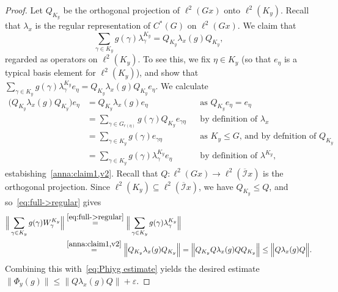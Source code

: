 \documentclass[a4paper, 12pt]{amsart}
\theoremstyle{plain}
\theoremstyle{definition}
\theoremstyle{remark}
\newcommand{\Iicl}{\overline{\mathcal{I}}}
\numberwithin{equation}{section}
\begin{document}
\begin{proof}
Let $Q_{K_y}$ be the orthogonal projection of $\ell^2(Gx)$ onto $\ell^2(K_y)$.  Recall that $\lambda_x$ is the regular
representation of $C^*(G)$ on $\ell^2(Gx)$. We claim that
\begin{equation}\label{anna:claim1,v2}
	\sum_{\gamma \in K_y} g(\gamma) \lambda^{K_y}_\gamma = Q_{K_y} \lambda_x(g) Q_{K_y},
\end{equation}
regarded as operators on $\ell^2(K_y)$. To see this, we fix $\eta \in K_y$ (so that $e_\eta$ is a typical basis element for $\ell^2(K_y)$), and show that $\sum_{\gamma \in K_y} g(\gamma) \lambda^{K_y}_\gamma e_\eta = Q_{K_y} \lambda_x(g) Q_{K_y} e_\eta$. We calculate
\begin{align*}
\bigl(Q_{K_y}\lambda_x(g)Q_{K_y}\bigr) e_\eta
	&=	Q_{K_y}\lambda_x(g) e_\eta
        &&\text{as } Q_{K_y}e_\eta = e_\eta \\
    &= \sum_{\gamma\in G_{r(\eta)}} g(\gamma)Q_{K_y} e_{\gamma\eta}
        &&\text{by definition of }\lambda_x \\
	&= \sum_{\gamma\in K_y} g(\gamma)e_{\gamma\eta}
        &&\text{as $K_y\leq G$, and by defnition of $Q_{K_{y}}$}\\
    &= \sum_{\gamma\in K_y} g(\gamma) \lambda^{K_y}_{\gamma} e_\eta
        &&\text{by definition of }\lambda^{K_y},
	\end{align*}
estabishing~\eqref{anna:claim1,v2}. Recall that $Q \colon \ell^2(Gx) \to \ell^2(\Iicl x)$ is the orthogonal projection. Since $\ell^2(K_y) \subseteq
\ell^2(\Iicl x)$, we have $Q_{K_y} \le Q$, and so~\eqref{eq:full->regular} gives
\begin{align*}		
\Big\|\sum_{\gamma \in K_y} g(\gamma) W^{K_y}_\gamma\Big\|
	&\overset{\eqref{eq:full->regular}}{=} \Big\|\sum_{\gamma \in K_y} g(\gamma) \lambda^{K_y}_\gamma\Big\|\\
	&\overset{\eqref{anna:claim1,v2}}{=} \Big\| Q_{K_y} \lambda_x(g) Q_{K_y}\Big\|		
    = \Big\|Q_{K_y} Q \lambda_x(g)Q Q_{K_y}\Big\|
    \leq \Big\| Q \lambda_x(g) Q\Big\|.
\end{align*}
Combining this with~\eqref{eq:Phiyg estimate} yields the desired estimate $\|\Phi_y(g)\| \le \|Q \lambda_x(g) Q\| + \varepsilon$.
\end{proof}
\end{document}
